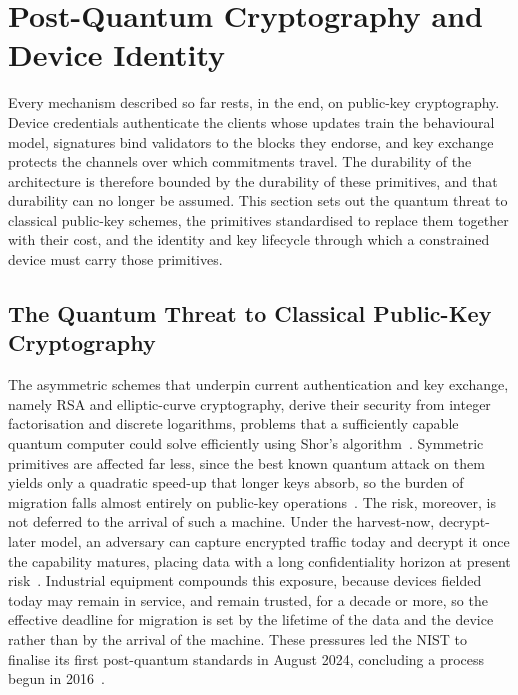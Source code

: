 \section{Post-Quantum Cryptography and Device Identity}
\label{sec:bg-pqc}

Every mechanism described so far rests, in the end, on public-key cryptography.
Device credentials authenticate the clients whose updates train the behavioural
model, signatures bind validators to the blocks they endorse, and key exchange
protects the channels over which commitments travel. The durability of the
architecture is therefore bounded by the durability of these primitives, and
that durability can no longer be assumed. This section sets out the quantum
threat to classical public-key schemes, the primitives standardised to replace
them together with their cost, and the identity and key lifecycle through which
a constrained device must carry those primitives.

\subsection{The Quantum Threat to Classical Public-Key Cryptography}
\label{subsec:bg-quantum-threat}

The asymmetric schemes that underpin current authentication and key exchange,
namely RSA and elliptic-curve cryptography, derive their security from integer
factorisation and discrete logarithms, problems that a sufficiently capable
quantum computer could solve efficiently using Shor's
algorithm~\cite{shor1999polynomial}. Symmetric primitives are affected far less,
since the best known quantum attack on them yields only a quadratic speed-up that
longer keys absorb, so the burden of migration falls almost entirely on
public-key operations~\cite{wang2025review}. The risk, moreover, is not deferred
to the arrival of such a machine. Under the harvest-now, decrypt-later model, an
adversary can capture encrypted traffic today and decrypt it once the capability
matures, placing data with a long confidentiality horizon at present
risk~\cite{kagai2025harvest, singh2024managing}. Industrial equipment compounds
this exposure, because devices fielded today may remain in service, and remain
trusted, for a decade or more, so the effective deadline for migration is set by
the lifetime of the data and the device rather than by the arrival of the
machine. These pressures led the NIST to finalise its first post-quantum
standards in August 2024,
concluding a process begun in 2016~\cite{fips203, fips204, fips205}.

